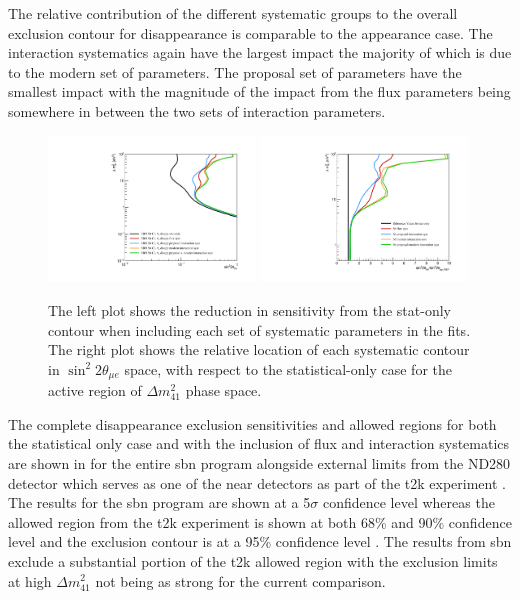 The relative contribution of the different systematic groups to the overall exclusion contour for \nue disappearance is comparable to the \nue appearance case. The interaction systematics again have the largest impact the majority of which is due to the modern set of parameters. The proposal set of parameters have the smallest impact with the magnitude of the impact from the flux parameters being somewhere in between the two sets of interaction parameters.

\begin{figure}[h!]
    \centering
    \includegraphics[width = 0.49\textwidth]{figures-chap6/exclusion_contours/nue_disapp_syst_groups.pdf}
    \includegraphics[width = 0.49\textwidth]{figures-chap6/exclusion_contours/nue_disapp_syst_groups_ratios.pdf}
    \caption[\nue app sensitivity reduction from different systematic groups.]{The left plot shows the reduction in sensitivity from the stat-only contour when including each set of systematic parameters in the fits. The right plot shows the relative location of each systematic contour in $\sin^{2}2\theta_{\mu e}$ space, with respect to the statistical-only case for the active region of $\Delta m_{41}^{2}$ phase space.}
    \label{fig:nue_app_syst_groups}
\end{figure}

\newpage
The complete \nue disappearance exclusion sensitivities and allowed regions for both the statistical only case and with the inclusion of flux and interaction systematics are shown in  for the entire \gls{sbn} program alongside external limits from the ND280 detector which serves as one of the near detectors as part of the \gls{t2k} experiment \cite{t2k_experiment}. The results for the \gls{sbn} program are shown at a 5$\sigma$ confidence level whereas the allowed region from the \gls{t2k} experiment is shown at both 68\% and 90\% confidence level and the exclusion contour is at a 95\% confidence level \cite{T2K_nue_disapp_contour}. The results from \gls{sbn} exclude a substantial portion of the \gls{t2k} allowed region with the exclusion limits at high $\Delta m^2_{41}$ not being as strong for the current comparison. 

